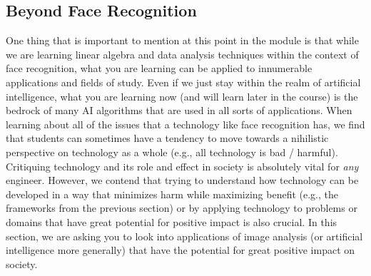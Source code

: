 \subsection{Beyond Face Recognition}

One thing that is important to mention at this point in the module is that while we are learning linear algebra and data analysis techniques within the context of face recognition, what you are learning can be applied to innumerable applications and fields of study.  Even if we just stay within the realm of artificial intelligence, what you are learning now (and will learn later in the course) is the bedrock of many AI algorithms that are used in all sorts of applications.  When learning about all of the issues that a technology like face recognition has, we find that students can sometimes have a tendency to move towards a nihilistic perspective on technology as a whole (e.g., all technology is bad / harmful).  Critiquing technology and its role and effect in society is absolutely vital for \emph{any} engineer.  However, we contend that trying to understand how technology can be developed in a way that minimizes harm while maximizing benefit (e.g., the frameworks from the previous section) or by applying technology to problems or domains that have great potential for positive impact is also crucial.  In this section, we are asking you to look into applications of image analysis (or artificial intelligence more generally) that have the potential for great positive impact on society.

